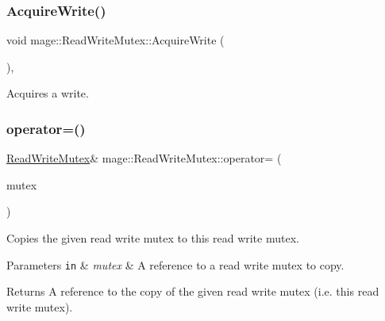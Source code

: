 \subsubsection{\texorpdfstring{Acquire\+Write()}{AcquireWrite()}}
{\footnotesize\ttfamily void mage\+::\+Read\+Write\+Mutex\+::\+Acquire\+Write (\begin{DoxyParamCaption}{ }\end{DoxyParamCaption})\hspace{0.3cm}{\ttfamily [private]}, {\ttfamily [noexcept]}}

Acquires a write. \hypertarget{structmage_1_1_read_write_mutex_a408e06f3c8bcc644e43afbf7e9ac772f}{}\label{structmage_1_1_read_write_mutex_a408e06f3c8bcc644e43afbf7e9ac772f} 
\subsubsection{\texorpdfstring{operator=()}{operator=()}\hspace{0.1cm}{\footnotesize\ttfamily [1/2]}}
{\footnotesize\ttfamily \hyperlink{structmage_1_1_read_write_mutex}{Read\+Write\+Mutex}\& mage\+::\+Read\+Write\+Mutex\+::operator= (\begin{DoxyParamCaption}\item[{const \hyperlink{structmage_1_1_read_write_mutex}{Read\+Write\+Mutex} \&}]{mutex }\end{DoxyParamCaption})\hspace{0.3cm}{\ttfamily [delete]}}

Copies the given read write mutex to this read write mutex.


\begin{DoxyParams}[1]{Parameters}
\mbox{\tt in}  & {\em mutex} & A reference to a read write mutex to copy. \\
\hline
\end{DoxyParams}
\begin{DoxyReturn}{Returns}
A reference to the copy of the given read write mutex (i.\+e. this read write mutex). 
\end{DoxyReturn}
\hypertarget{structmage_1_1_read_write_mutex_a14ea4d1be75046741a7663e0d86a017a}{}\label{structmage_1_1_read_write_mutex_a14ea4d1be75046741a7663e0d86a017a} 
